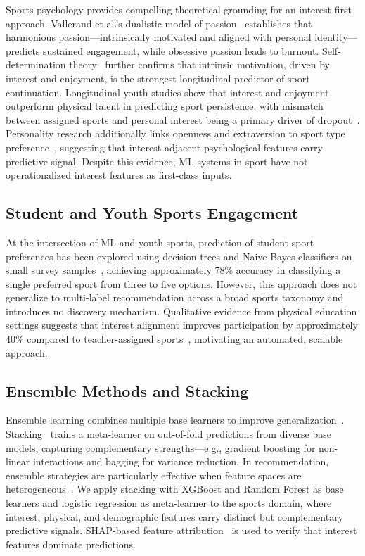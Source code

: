 \documentclass[conference]{IEEEtran}
\begin{document}
Sports psychology provides compelling theoretical grounding for an
interest-first approach.
Vallerand et al.'s dualistic model of passion~\cite{vallerand2003passions}
establishes that harmonious passion---intrinsically motivated and aligned with
personal identity---predicts sustained engagement, while obsessive passion
leads to burnout.
Self-determination theory~\cite{pelletier1995motivation} further confirms
that intrinsic motivation, driven by interest and enjoyment, is the strongest
longitudinal predictor of sport continuation.
Longitudinal youth studies show that interest and enjoyment outperform
physical talent in predicting sport persistence, with mismatch between
assigned sports and personal interest being a primary driver of
dropout~\cite{fraserThomas2006youth}.
Personality research additionally links openness and extraversion to sport
type preference~\cite{allen2013personality}, suggesting that interest-adjacent
psychological features carry predictive signal.
Despite this evidence, ML systems in sport have not operationalized interest
features as first-class inputs.

\subsection{Student and Youth Sports Engagement}

At the intersection of ML and youth sports, prediction of student sport
preferences has been explored using decision trees and Naive Bayes classifiers
on small survey samples~\cite{iarci2023student}, achieving approximately
78\% accuracy in classifying a single preferred sport from three to five
options.
However, this approach does not generalize to multi-label recommendation
across a broad sports taxonomy and introduces no discovery mechanism.
Qualitative evidence from physical education settings suggests that interest
alignment improves participation by approximately 40\% compared to
teacher-assigned sports~\cite{holt2008coaches}, motivating an automated,
scalable approach.

\subsection{Ensemble Methods and Stacking}

Ensemble learning combines multiple base learners to improve
generalization~\cite{breiman2001random}.
Stacking~\cite{wolpert1992stacked} trains a meta-learner on
out-of-fold predictions from diverse base models, capturing
complementary strengths---e.g., gradient boosting for non-linear
interactions and bagging for variance reduction.
In recommendation, ensemble strategies are particularly effective
when feature spaces are heterogeneous~\cite{breiman2001random}.
We apply stacking with XGBoost and Random Forest as base learners
and logistic regression as meta-learner to the sports domain,
where interest, physical, and demographic features carry distinct
but complementary predictive signals.
SHAP-based feature attribution~\cite{lundberg2017shap} is used to verify
that interest features dominate predictions.
\end{document}
